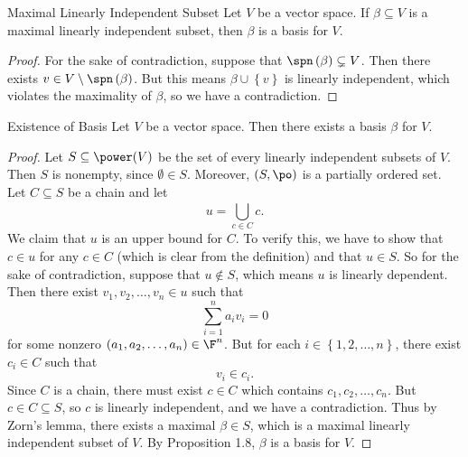\documentclass[linearalgebra]{subfiles}
\begin{document}
    \begin{prop}{Maximal Linearly Independent Subset}
        Let $V$ be a vector space. If $\beta\subseteq V$ is a maximal linearly independent subset, then $\beta$ is a basis for $V$.
    \end{prop}

    \begin{proof}
        For the sake of contradiction, suppose that $\spn\left( \beta \right)\subsetneq V$. Then there exists $v\in V\setminus\spn\left( \beta \right)$. But this means $\beta\cup\left\lbrace v \right\rbrace$ is linearly independent, which violates the maximality of $\beta$, so we have a contradiction.
    \end{proof}

    \begin{theorem}{Existence of Basis}
        Let $V$ be a vector space. Then there exists a basis $\beta$ for $V$.
    \end{theorem}

    \begin{proof}
        Let $S\subseteq\power(V)$ be the set of every linearly independent subsets of $V$. Then $S$ is nonempty, since $\emptyset\in S$. Moreover, $\left( S,\po \right)$ is a partially ordered set. Let $C\subseteq S$ be a chain and let
        \begin{equation*}
            u = \bigcup^{}_{c\in C} c.
        \end{equation*}
        We claim that $u$ is an upper bound for $C$. To verify this, we have to show that $c\in u$ for any $c\in C$ (which is clear from the definition) and that $u\in S$. So for the sake of contradiction, suppose that $u\notin S$, which means $u$ is linearly dependent. Then there exist $v_1,v_2,\ldots,v_n\in u$ such that
        \begin{equation*}
            \sum^{n}_{i=1} a_iv_i = 0
        \end{equation*}
        for some nonzero $\left( a_1,a_2,\ldots,a_n \right) \in\F^n$. But for each $i\in\left\lbrace 1,2,\ldots,n \right\rbrace$, there exist $c_i\in C$ such that
        \begin{equation*}
            v_i\in c_i.
        \end{equation*}
        Since $C$ is a chain, there must exist $c\in C$ which contains $c_1,c_2,\ldots,c_n$. But $c\in C\subseteq S$, so $c$ is linearly independent, and we have a contradiction. Thus by Zorn's lemma, there exists a maximal $\beta\in S$, which is a maximal linearly independent subset of $V$. By Proposition 1.8, $\beta$ is a basis for $V$.
    \end{proof}
\end{document}
